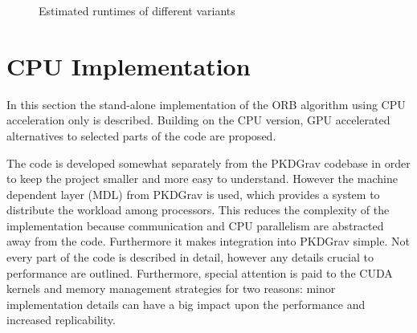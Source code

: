 \documentclass[]{article}
\begin{document}
\begin{figure}[H]
	\begin{center}
	\end{center}

\caption{Estimated runtimes of different variants}
\label{fig:exectimes}
\end{figure}


\newpage
\section{CPU Implementation}

In this section the stand-alone implementation of the ORB algorithm using CPU acceleration only is described. Building on the CPU version, GPU accelerated alternatives to selected parts of the code are proposed. 

The code is developed somewhat separately from the PKDGrav codebase in order to keep the project smaller and more easy to understand. However the machine dependent layer (MDL) from PKDGrav is used, which provides a system to distribute the workload among processors. This reduces the complexity of the implementation because communication and CPU parallelism are abstracted away from the code. Furthermore it makes integration into PKDGrav simple.
Not every part of the code is described in detail, however any details crucial to performance are outlined. Furthermore, special attention is paid to the CUDA kernels and memory management strategies for two reasons: minor implementation details can have a big impact upon the performance and increased replicability.
\end{document}
